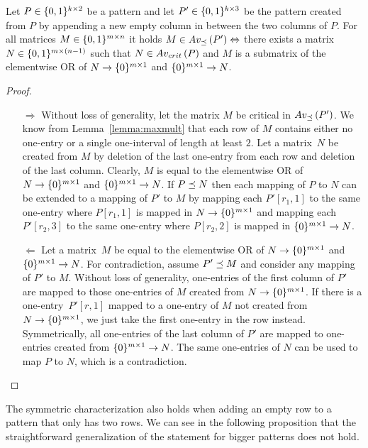 \begin{thm}
\label{thm:emptymiddle}
Let $P\in\{0,1\}^{k\times2}$ be a pattern and let $P'\in\{0,1\}^{k\times3}$ be the pattern created from $P$ by appending a new empty column in between the two columns of $P$. For all matrices $M\in\{0,1\}^{m\times n}$ it holds $M\in Av_{\preceq}\left(P'\right)\Leftrightarrow$ there exists a matrix $N\in\{0,1\}^{m\times(n-1)}$ such that $N\in Av_{crit}\left(P\right)$ and $M$ is a submatrix of the elementwise OR of $N\rightarrow\{0\}^{m\times1}$ and $\{0\}^{m\times1}\rightarrow N$.
\end{thm}
\begin{proof}
\begin{itemize}
	\item[$\Rightarrow$] Without loss of generality, let the matrix $M$ be critical in $Av_{\preceq}\left(P'\right)$. We know from Lemma~\ref{lemma:maxmult} that each row of $M$ contains either no one-entry or a single one-interval of length at least $2$. Let a matrix~$N$ be created from $M$ by deletion of the last one-entry from each row and deletion of the last column. Clearly, $M$ is equal to the elementwise OR of $N\rightarrow\{0\}^{m\times1}$ and $\{0\}^{m\times1}\rightarrow N$. If $P\preceq N$ then each mapping of $P$ to $N$ can be extended to a mapping of $P'$ to $M$ by mapping each $P'[r_1,1]$ to the same one-entry where $P[r_1,1]$ is mapped in $N\rightarrow\{0\}^{m\times1}$ and mapping each $P'[r_2,3]$ to the same one-entry where $P[r_2,2]$ is mapped in $\{0\}^{m\times1}\rightarrow N$.
	\item[$\Leftarrow$] Let a matrix~$M$ be equal to the elementwise OR of $N\rightarrow\{0\}^{m\times1}$ and $\{0\}^{m\times1}\rightarrow N$. For contradiction, assume $P'\preceq M$ and consider any mapping of $P'$ to $M$. Without loss of generality, one-entries of the first column of $P'$ are mapped to those one-entries of $M$ created from $N\rightarrow\{0\}^{m\times1}$. If there is a one-entry~$P'[r,1]$ mapped to a one-entry of $M$ not created from $N\rightarrow\{0\}^{m\times1}$, we just take the first one-entry in the row instead. Symmetrically, all one-entries of the last column of $P'$ are mapped to one-entries created from $\{0\}^{m\times1}\rightarrow N$. The same one-entries of $N$ can be used to map $P$ to $N$, which is a contradiction. \qedhere
\end{itemize}
\end{proof}

The symmetric characterization also holds when adding an empty row to a pattern that only has two rows. We can see in the following proposition that the straightforward generalization of the statement for bigger patterns does not hold.


